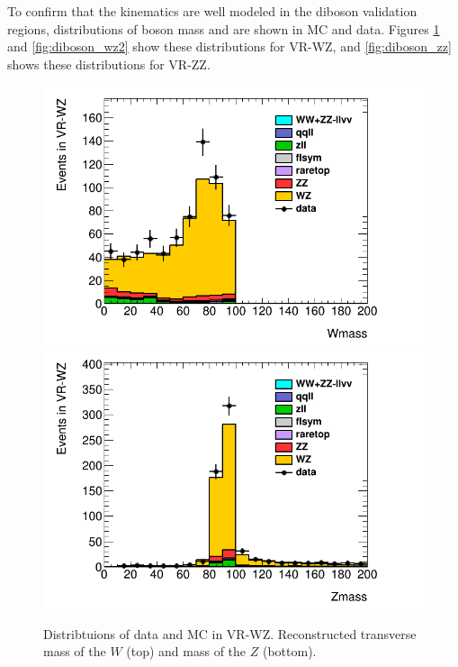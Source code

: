 To confirm that the kinematics are well modeled in the diboson validation regions, distributions of boson mass and \pt are shown in \ac{MC} and data. Figures \ref{fig:diboson_wz} and \ref{fig:diboson_wz2} show these distributions for VR-WZ, and \autoref{fig:diboson_zz} shows these distributions for VR-ZZ. 

\begin{centering}
\begin{figure}[htbp]
\centering
\includegraphics[width=.9\textwidth]{figures/dibosons/WZ_Wmass.png}
\includegraphics[width=.9\textwidth]{figures/dibosons/WZ_Zmass.png}
\caption{Distribtuions of data and \ac{MC} in VR-WZ. Reconstructed transverse mass of the $W$ (top) and mass of the $Z$ (bottom). \label{fig:diboson_wz}}
\end{figure}
\end{centering}

